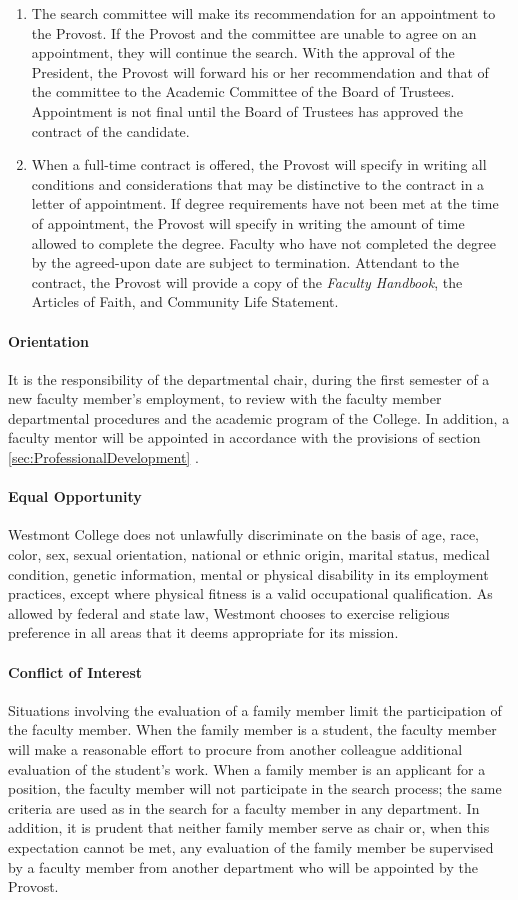 				\begin{enumerate}[label=\alph*)]
					\item{The search committee will make its recommendation for an appointment to the Provost.  If the Provost and the committee are unable to agree on an appointment, they will continue the search.  With the approval of the President, the Provost will forward his or her recommendation and that of the committee to the Academic Committee of the Board of Trustees.  Appointment is not final until the Board of Trustees has approved the contract of the candidate.}
					\item{When a full-time contract is offered, the Provost will specify in writing all conditions and considerations that may be distinctive to the contract in a letter of appointment.  If degree requirements have not been met at the time of appointment, the Provost will specify in writing the amount of time allowed to complete the degree.  Faculty who have not completed the degree by the agreed-upon date are subject to termination.  Attendant to the contract, the Provost will provide a copy of the \emph{Faculty Handbook}, the Articles of Faith, and Community Life Statement.}
				\end{enumerate}
			\paragraph{Orientation}
				It is the responsibility of the departmental chair, during the first semester of a new faculty member's employment, to review with the faculty member departmental procedures and the academic program of the College.  In addition, a faculty mentor will be appointed in accordance with the provisions of section
				\ref{sec:ProfessionalDevelopment}
				.
			\paragraph{Equal Opportunity}
				Westmont College does not unlawfully discriminate on the basis of age, race, color, sex, sexual orientation, national or ethnic origin, marital status, medical condition, genetic information, mental or physical disability in its employment practices, except where physical fitness is a valid occupational qualification. As allowed by federal and state law, Westmont chooses to exercise religious preference in all areas that it deems appropriate for its mission.
			\paragraph{Conflict of Interest}
				Situations involving the evaluation of a family member limit the participation of the faculty member.  When the family member is a student, the faculty member will make a reasonable effort to procure from another colleague additional evaluation of the student's work.  When a family member is an applicant for a position, the faculty member will not participate in the search process; the same criteria are used as in the search for a faculty member in any department.  In addition, it is prudent that neither family member serve as chair or, when this expectation cannot be met, any evaluation of the family member be supervised by a faculty member from another department who will be appointed by the Provost.
